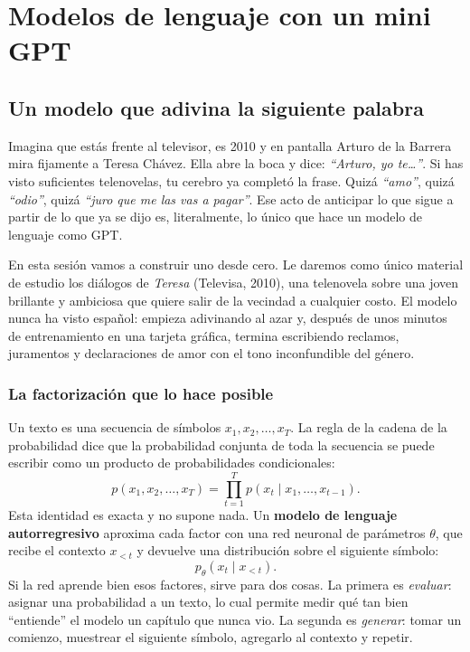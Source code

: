 \documentclass[11pt,letterpaper,oneside]{report}
\begin{document}
\portada
\tableofcontents
\setcounter{chapter}{5}
\chapter{Modelos de lenguaje con un mini GPT}

\section{Un modelo que adivina la siguiente palabra}

Imagina que estás frente al televisor, es 2010 y en pantalla Arturo de la Barrera mira fijamente a Teresa Chávez. Ella abre la boca y dice: \emph{``Arturo, yo te\ldots''}. Si has visto suficientes telenovelas, tu cerebro ya completó la frase. Quizá \emph{``amo''}, quizá \emph{``odio''}, quizá \emph{``juro que me las vas a pagar''}. Ese acto de anticipar lo que sigue a partir de lo que ya se dijo es, literalmente, lo único que hace un modelo de lenguaje como GPT.

En esta sesión vamos a construir uno desde cero. Le daremos como único material de estudio los diálogos de \emph{Teresa} (Televisa, 2010), una telenovela sobre una joven brillante y ambiciosa que quiere salir de la vecindad a cualquier costo. El modelo nunca ha visto español: empieza adivinando al azar y, después de unos minutos de entrenamiento en una tarjeta gráfica, termina escribiendo reclamos, juramentos y declaraciones de amor con el tono inconfundible del género.

\subsection{La factorización que lo hace posible}

Un texto es una secuencia de símbolos $x_1, x_2, \dots, x_T$. La regla de la cadena de la probabilidad dice que la probabilidad conjunta de toda la secuencia se puede escribir como un producto de probabilidades condicionales:
\begin{equation}\label{eq:cadena}
  p(x_1, x_2, \dots, x_T) = \prod_{t=1}^{T} p(x_t \mid x_1, \dots, x_{t-1}).
\end{equation}
Esta identidad es exacta y no supone nada. Un \textbf{modelo de lenguaje autorregresivo} aproxima cada factor con una red neuronal de parámetros $\theta$, que recibe el contexto $x_{<t}$ y devuelve una distribución sobre el siguiente símbolo:
\[
  p_\theta(x_t \mid x_{<t}).
\]
Si la red aprende bien esos factores, sirve para dos cosas. La primera es \emph{evaluar}: asignar una probabilidad a un texto, lo cual permite medir qué tan bien ``entiende'' el modelo un capítulo que nunca vio. La segunda es \emph{generar}: tomar un comienzo, muestrear el siguiente símbolo, agregarlo al contexto y repetir.
\end{document}
